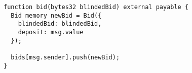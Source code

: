 \begin{lstlisting}[language=Solidity]
function bid(bytes32 blindedBid) external payable {
  Bid memory newBid = Bid({
  	blindedBid: blindedBid,
  	deposit: msg.value
  });

  bids[msg.sender].push(newBid);
}
\end{lstlisting}